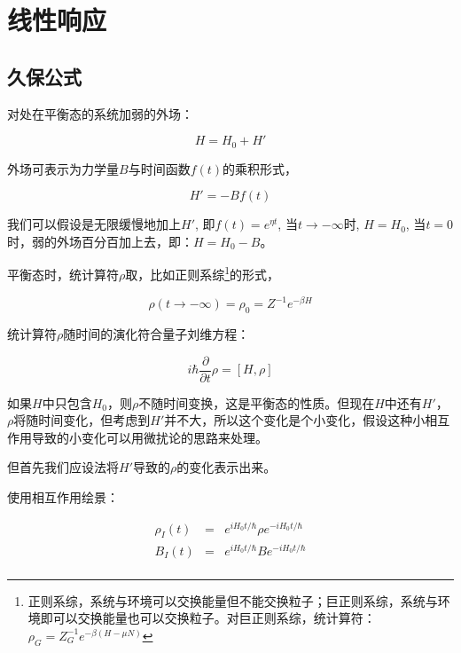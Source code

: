 \section{线性响应}


\subsection{久保公式}

对处在平衡态的系统加弱的外场：

\begin{equation}
H = H_0 + H'
\end{equation}

外场可表示为力学量$B$与时间函数$f(t)$的乘积形式，

\begin{equation}
H' = - Bf(t)
\end{equation}

我们可以假设是无限缓慢地加上$H'$, 即$f(t) = e^{\eta t}$, 当$t \to - \infty$时, $H = H_0$, 当$t = 0$时，弱的外场百分百加上去，即：$H = H_0 - B$。

平衡态时，统计算符$\rho$取，比如正则系综\footnote{正则系综，系统与环境可以交换能量但不能交换粒子；巨正则系综，系统与环境即可以交换能量也可以交换粒子。对巨正则系综，统计算符：$\rho_G = Z_G^{-1} e^{-\beta (H -\mu N)}$}的形式，

\begin{equation}
\rho(t \to - \infty) = \rho_0 = Z^{-1} e^{-\beta H}
\end{equation}

统计算符$\rho$随时间的演化符合量子刘维方程：

\begin{equation}
i \hbar \frac{\partial}{\partial t }\rho = [H, \rho]
\end{equation}

如果$H$中只包含$H_0$，则$\rho$不随时间变换，这是平衡态的性质。但现在$H$中还有$H'$，$\rho$将随时间变化，但考虑到$H'$并不大，所以这个变化是个小变化，假设这种小相互作用导致的小变化可以用微扰论的思路来处理。

但首先我们应设法将$H'$导致的$\rho$的变化表示出来。

使用相互作用绘景：

\begin{eqnarray}
\rho_I (t)  & = & e^{i H_0 t / \hbar} \rho e^{- i H_0 t / \hbar} \\
B_I (t)  & = &  e^{i H_0 t / \hbar} B e^{- i H_0 t / \hbar} \\  
\end{eqnarray}


